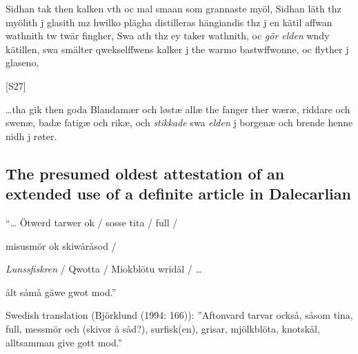 Sidhan tak then kalken vth oc mal smaan som grannaste myöl, Sidhan läth thz myölith j glasith mz hwilko plägha distilleras hängiandis thz j en kätil affwan wathnith tw twär fingher, Swa ath thz ey taker wathnith, oc \textit{gör elden} wndy kätillen, swa smälter qwekselffwens kalker j the warmo bastwffwonne, oc flyther j glaseno, 

[S27]

…tha gik then goda Blandamær\newline
och løstæ allæ the fanger ther\newline
wæræ, riddare och swenæ,\newline
badæ fatigæ och rikæ,\newline
och \textit{stikkade} swa \textit{elden} j borgenæ och brende henne nidh j røter.


\subsection[The presumed oldest attestation of an extended use of a definite article in Dalecarlian]{The presumed oldest attestation of an extended use of a definite article in Dalecarlian}
“… Ötwerd tarwer ok / sosse tita / full /


misusmör ok skiwåråsod /


\textit{Lunssfiskren} / Qwotta / Miokblötu wridäl / …

ålt såmå gäwe gwot mod.”


Swedish translation (Björklund (1994: 166)): ”Aftonvard tarvar också, såsom tina, full, messmör och (skivor å såd?), surfisk(en), grisar, mjölkblöta, knotskål, alltsamman give gott mod.”

